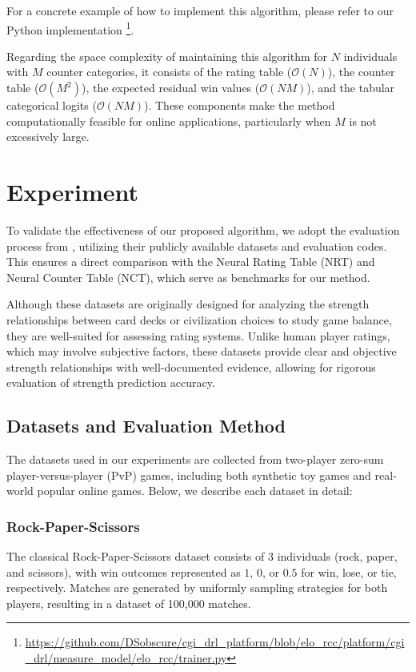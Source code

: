 For a concrete example of how to implement this algorithm, please refer to our Python implementation \footnote{\url{https://github.com/DSobscure/cgi_drl_platform/blob/elo_rcc/platform/cgi_drl/measure_model/elo_rcc/trainer.py}}.

Regarding the space complexity of maintaining this algorithm for $N$ individuals with $M$ counter categories, it consists of the rating table ($\mathcal{O}(N)$), the counter table ($\mathcal{O}(M^2)$), the expected residual win values ($\mathcal{O}(NM)$), and the tabular categorical logits ($\mathcal{O}(NM)$). These components make the method computationally feasible for online applications, particularly when $M$ is not excessively large.

\section{Experiment}
To validate the effectiveness of our proposed algorithm, we adopt the evaluation process from \citet{game_balance_analysis}, utilizing their publicly available datasets and evaluation codes. This ensures a direct comparison with the Neural Rating Table (NRT) and Neural Counter Table (NCT), which serve as benchmarks for our method.

Although these datasets are originally designed for analyzing the strength relationships between card decks or civilization choices to study game balance, they are well-suited for assessing rating systems. Unlike human player ratings, which may involve subjective factors, these datasets provide clear and objective strength relationships with well-documented evidence, allowing for rigorous evaluation of strength prediction accuracy.

\subsection{Datasets and Evaluation Method}

The datasets used in our experiments are collected from two-player zero-sum player-versus-player (PvP) games, including both synthetic toy games and real-world popular online games. Below, we describe each dataset in detail:

\subsubsection{Rock-Paper-Scissors}

The classical Rock-Paper-Scissors dataset consists of 3 individuals (rock, paper, and scissors), with win outcomes represented as $1$, $0$, or $0.5$ for win, lose, or tie, respectively. Matches are generated by uniformly sampling strategies for both players, resulting in a dataset of 100,000 matches.

